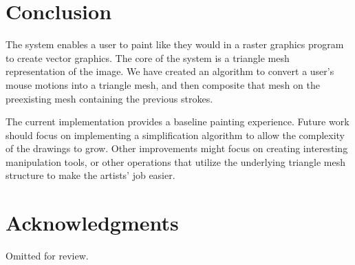 \documentclass[review]{acmsiggraph}
\begin{document}
\section{Conclusion}
The system enables a user to paint like they would in a raster graphics program 
to create vector graphics. The core of the system is a triangle mesh representation of the image.
We have created an algorithm to convert a user's mouse motions into a triangle mesh, and then composite
that mesh on the preexisting mesh containing the previous strokes.

The current implementation provides a baseline painting experience. Future work should focus on
implementing a simplification algorithm to allow the complexity of the drawings to grow. Other
improvements might focus on creating interesting manipulation tools, or other operations that utilize
the underlying triangle mesh structure to make the artists' job easier.


\section*{Acknowledgments}

Omitted for review.



\end{document}
